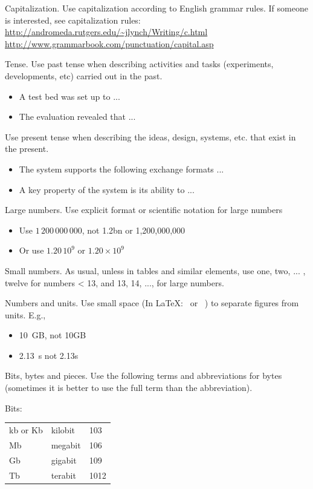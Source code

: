 \documentclass[10pt]{report}
\begin{document}
Capitalization. Use capitalization according to English grammar rules. If someone is interested, see 
capitalization rules:\\
\url{http://andromeda.rutgers.edu/~jlynch/Writing/c.html}\\
\url{http://www.grammarbook.com/punctuation/capital.asp}

Tense. Use past tense when describing activities and tasks (experiments, developments, etc) carried out in the past. 

\begin{itemize}
\item  A test bed was set up to ...
\item  The evaluation revealed that ...
\end{itemize}

Use present tense when describing the ideas, design, systems, etc. that exist in the present. 

\begin{itemize}
\item The system supports the following exchange formats ...
\item  A key property of the system is its ability to ...
\end{itemize}

Large numbers. Use explicit format or scientific notation for large numbers

\begin{itemize}
\item Use $1\,200\,000\,000$, not 1.2bn or 1,200,000,000
\item Or use $1.20\,10^9$ or $1.20 \times 10^9$
\end{itemize}

Small numbers. As usual, unless in tables and similar elements,
use {one, two, ... , twelve} for numbers < 13, and {13, 14, ..., }
for large numbers.

Numbers and units. Use small space (In \LaTeX: \, or ~) to separate
figures from units. E.g.,

\begin{itemize}
\item 10~GB, not 10GB
\item 2.13~s not 2.13s
\end{itemize}

Bits, bytes and pieces. Use the following terms and abbreviations for
bytes (sometimes it is better to use the full term than the
abbreviation).

Bits:\\
\begin{tabular}{lll}
kb or Kb&	kilobit&	103\\ 
Mb&	megabit&	106\\ 
Gb&	gigabit&	109\\ 
Tb&	terabit&	1012\\ 
\end{tabular}
\end{document}
